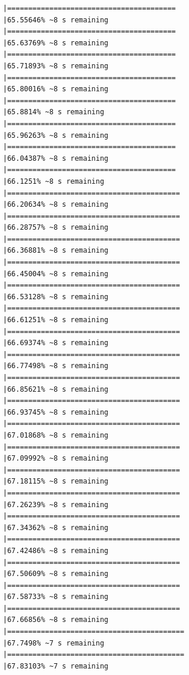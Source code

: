 \documentclass{article}\usepackage[]{graphicx}\usepackage[]{xcolor}
\makeatletter
\newenvironment{kframe}{%
 \def\at@end@of@kframe{}%
 \ifinner\ifhmode%
  \def\at@end@of@kframe{\end{minipage}}%
  \begin{minipage}{\columnwidth}%
 \fi\fi%
 \def\FrameCommand##1{\hskip\@totalleftmargin \hskip-\fboxsep
 \colorbox{shadecolor}{##1}\hskip-\fboxsep
     \hskip-\linewidth \hskip-\@totalleftmargin \hskip\columnwidth}%
 \MakeFramed {\advance\hsize-\width
   \@totalleftmargin\z@ \linewidth\hsize
   \@setminipage}}%
 {\par\unskip\endMakeFramed%
 \at@end@of@kframe}
\newenvironment{knitrout}{}{} %
\makeatother
\begin{document}
\begin{knitrout}
\begin{kframe}
\begin{verbatim}
|========================================                      |65.55646% ~8 s remaining  
|========================================                      |65.63769% ~8 s remaining  
|========================================                      |65.71893% ~8 s remaining  
|========================================                      |65.80016% ~8 s remaining  
|========================================                      |65.8814% ~8 s remaining   
|========================================                      |65.96263% ~8 s remaining  
|========================================                      |66.04387% ~8 s remaining  
|========================================                      |66.1251% ~8 s remaining   
|=========================================                     |66.20634% ~8 s remaining  
|=========================================                     |66.28757% ~8 s remaining  
|=========================================                     |66.36881% ~8 s remaining  
|=========================================                     |66.45004% ~8 s remaining  
|=========================================                     |66.53128% ~8 s remaining  
|=========================================                     |66.61251% ~8 s remaining  
|=========================================                     |66.69374% ~8 s remaining  
|=========================================                     |66.77498% ~8 s remaining  
|=========================================                     |66.85621% ~8 s remaining  
|=========================================                     |66.93745% ~8 s remaining  
|=========================================                     |67.01868% ~8 s remaining  
|=========================================                     |67.09992% ~8 s remaining  
|=========================================                     |67.18115% ~8 s remaining  
|=========================================                     |67.26239% ~8 s remaining  
|=========================================                     |67.34362% ~8 s remaining  
|=========================================                     |67.42486% ~8 s remaining  
|=========================================                     |67.50609% ~8 s remaining  
|=========================================                     |67.58733% ~8 s remaining  
|=========================================                     |67.66856% ~8 s remaining  
|==========================================                    |67.7498% ~7 s remaining   
|==========================================                    |67.83103% ~7 s remaining  

\end{verbatim}
\end{kframe}
\end{knitrout}
\end{document}
